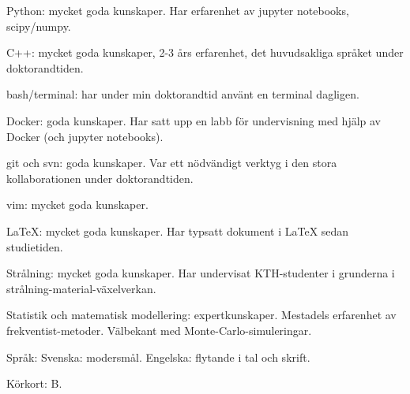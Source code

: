 



\begin{cvskills}



\cvskill
{Python:}
{mycket goda kunskaper. Har erfarenhet av jupyter notebooks, scipy/numpy.}

\cvskill
{C++:}
{mycket goda kunskaper, 2-3 års erfarenhet, det huvudsakliga språket under doktorandtiden.}

\cvskill
{bash/terminal:}
{har under min doktorandtid anv{\"a}nt en terminal dagligen.}

\cvskill
{Docker:} 
{goda kunskaper. Har satt upp en labb f{\"o}r undervisning med hj{\"a}lp av Docker (och jupyter notebooks).}

\cvskill
{git och svn:}
{goda kunskaper. Var ett n{\"o}dv{\"a}ndigt verktyg i den stora kollaborationen under doktorandtiden.}

\cvskill
{vim:}
{mycket goda kunskaper.}

\cvskill
{LaTeX:}
{mycket goda kunskaper. Har typsatt dokument i LaTeX sedan studietiden.}

\cvskill
{Strålning:}
{mycket goda kunskaper. Har undervisat KTH-studenter i grunderna i strålning-material-växelverkan.}

\cvskill
{Statistik och} {}
\cvskill
{matematisk modellering:}
{expertkunskaper. Mestadels erfarenhet av frekventist-metoder. V{\"a}lbekant med Monte-Carlo-simuleringar.}

\cvskill
{Spr{\aa}k:}
{Svenska: modersm{\aa}l. Engelska: flytande i tal och skrift.}

\cvskill
{Körkort:}
{B.}


\end{cvskills}